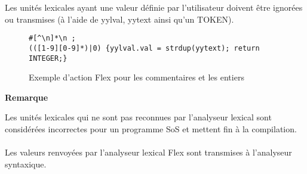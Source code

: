 Les unités lexicales ayant une valeur définie par l'utilisateur doivent être ignorées ou transmises (à l'aide de \textsf{yylval}, \textsf{yytext} ainsi qu'un TOKEN).
\begin{figure}[H]
\begin{lstlisting}
#[^\n]*\n ;
(([1-9][0-9]*)|0) {yylval.val = strdup(yytext); return INTEGER;}
\end{lstlisting}
\caption{Exemple d'action \textsf{Flex} pour les commentaires et les entiers}
\end{figure}

\noindent
\begin{minipage}[!hc]{0.12\textwidth}
   \textbf{Remarque}
\end{minipage}
\vrule\enskip\vrule\quad\begin{minipage}{\dimexpr 0.87\textwidth-0.8pt-1.5em}
Les unités lexicales qui ne sont pas reconnues par l'analyseur lexical sont considérées incorrectes pour un programme SoS et mettent fin à la compilation.
\end{minipage}

\paragraph{}
Les valeurs renvoyées par l'analyseur lexical \textsf{Flex} sont transmises à l'analyseur syntaxique.